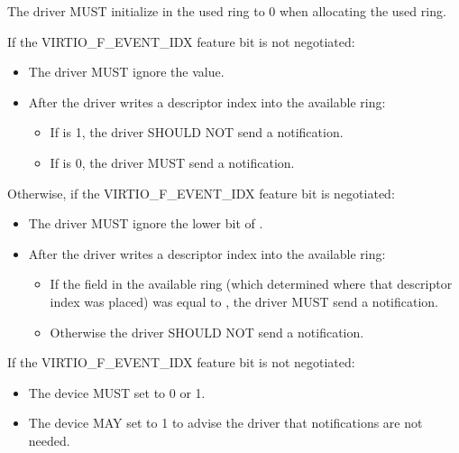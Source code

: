 
The driver MUST initialize  in the used ring to 0 when
allocating the used ring.

If the VIRTIO_F_EVENT_IDX feature bit is not negotiated:
\begin{itemize}
\item The driver MUST ignore the  value.
\item After the driver writes a descriptor index into the available ring:
  \begin{itemize}
        \item If  is 1, the driver SHOULD NOT send a notification.
        \item If  is 0, the driver MUST send a notification.
  \end{itemize}
\end{itemize}

Otherwise, if the VIRTIO_F_EVENT_IDX feature bit is negotiated:
\begin{itemize}
\item The driver MUST ignore the lower bit of .
\item After the driver writes a descriptor index into the available ring:
  \begin{itemize}
        \item If the  field in the available ring (which determined
          where that descriptor index was placed) was equal to
          , the driver MUST send a notification.
        \item Otherwise the driver SHOULD NOT send a notification.
  \end{itemize}
\end{itemize}

If the VIRTIO_F_EVENT_IDX feature bit is not negotiated:
\begin{itemize}
\item The device MUST set  to 0 or 1.
\item The device MAY set  to 1 to advise
the driver that notifications are not needed.
\end{itemize}

